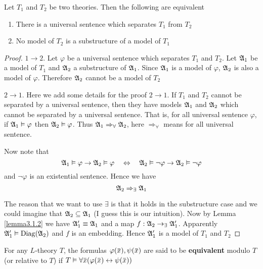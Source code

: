\documentclass[11pt]{article}
\begin{document}
\begin{theorem}[]
\label{thm3.1.3}
Let \(T_1\) and \(T_2\) be two theories. Then the following are equivalent
\begin{enumerate}
\item There is a universal sentence which separates \(T_1\) from \(T_2\)
\item No model of \(T_2\) is a substructure of a model of \(T_1\)
\end{enumerate}
\end{theorem}

\begin{proof}
\(1\to 2\).  Let \(\varphi\) be a universal sentence which separates \(T_1\) and \(T_2\). Let \(\mathfrak{A}_1\) be a model
of \(T_1\) and \(\mathfrak{A}_2\) a substructure of \(\mathfrak{A}_1\). Since \(\mathfrak{A}_1\) is a model of \(\varphi\), \(\mathfrak{A}_2\) is also a
model of \(\varphi\). Therefore \(\mathfrak{A}_2\) cannot be a model of \(T_2\)

 \(2\to1\).   Here we add some details for the proof \(2\to 1\). If \(T_1\) and \(T_2\) cannot be separated by a
universal sentence, then they have models \(\mathfrak{A}_1\) and \(\mathfrak{A}_2\)  which cannot be separated by a
universal sentence. That is, for all universal sentence \(\varphi\), if \(\mathfrak{A}_1\vDash\varphi\) then \(\mathfrak{A}_2\vDash\varphi\).
Thus \(\mathfrak{A}_1\Rightarrow_\forall\mathfrak{A}_2\), here \(\Rightarrow_\forall\) means for all universal sentence.

Now note that
\begin{equation*}
\mathfrak{A}_1\vDash\varphi\to\mathfrak{A}_2\vDash\varphi\quad\Leftrightarrow\quad\mathfrak{A}_2\vDash\neg\varphi\to\mathfrak{A}_2\vDash\neg\varphi
\end{equation*}
and \(\neg\varphi\) is an existential sentence. Hence we have
\begin{equation*}
\mathfrak{A}_2\Rightarrow_{\exists}\mathfrak{A}_1
\end{equation*}

The reason that we want to use \(\exists\) is that it holds in the substructure case and we could
imagine that \(\mathfrak{A}_2\subseteq\mathfrak{A}_1\) (I guess this is our intuition). Now by Lemma \ref{lemma3.1.2} we
have \(\mathfrak{A}_1'\equiv\mathfrak{A}_1\) and a map \(f:\mathfrak{A}_2\to_\exists\mathfrak{A}_1'\).
Apparently \(\mathfrak{A}_1'\vDash\operatorname{Diag}(\mathfrak{A}_2)\) and \(f\) is an embedding. Hence \(\mathfrak{A}_1'\) is a model of \(T_1\) and \(T_2\)
\end{proof}

\begin{definition}[]
For any \(L\)-theory \(T\), the formulas \(\varphi(\bbar{x}),\psi(\bbar{x})\) are said
to be \textbf{equivalent} modulo \(T\) (or relative to \(T\)) if \(T\vDash\forall\bbar{x}(\varphi(\bbar{x})\leftrightarrow\psi(\bbar{x}))\)
\end{definition}
\end{document}
